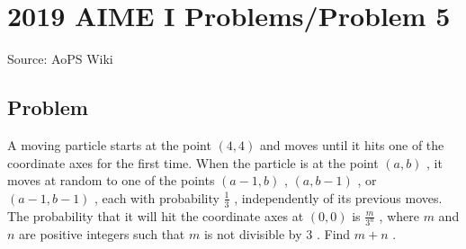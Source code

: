 \documentclass[12pt]{article}
\begin{document}
\section*{{2019 AIME I Problems/Problem 5}}
Source: AoPS Wiki

\subsection*{Problem}
A moving particle starts at the point $(4,4)$ and moves until it hits one of the coordinate axes for the first time. When the particle is at the point $(a,b)$ , it moves at random to one of the points $(a-1,b)$ , $(a,b-1)$ , or $(a-1,b-1)$ , each with probability $\frac{1}{3}$ , independently of its previous moves. The probability that it will hit the coordinate axes at $(0,0)$ is $\frac{m}{3^n}$ , where $m$ and $n$ are positive integers such that $m$ is not divisible by $3$ . Find $m + n$ .
\end{document}
